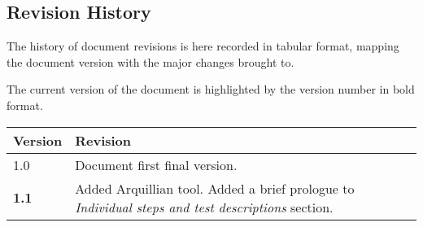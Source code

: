 \subsection{Revision History}

The history of document revisions is here recorded in tabular format, mapping the document version with the major changes brought to.

The current version of the document is highlighted by the version number in bold format.

\begin{longtable}{ |l|p{7cm}| }
	\hline
	\textbf{Version} & \textbf{Revision}\\ \hline
	1.0 & Document first final version.\\ \hline
	\textbf{1.1} & Added Arquillian tool. Added a brief prologue to \textit{Individual steps and test descriptions} section.\\ \hline
\end{longtable}
